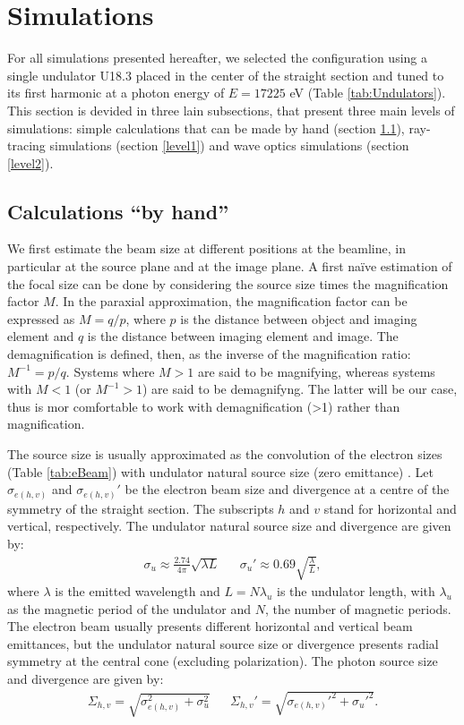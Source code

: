 \documentclass{iucr}              %
\begin{document}
\section{Simulations}

For all simulations presented hereafter, we selected the configuration using a single undulator U18.3 placed in the center of the straight section and tuned to its first harmonic at a photon energy of $E=17225$ eV (Table \ref{tab:Undulators}). This section is devided in three lain subsections, that present three main levels of simulations: simple calculations that can be made by hand (section \ref{level0}), ray-tracing simulations (section \ref{level1}) and wave optics simulations (section \ref{level2}).   

\subsection{Calculations ``by hand''}
\label{level0}

We first estimate the beam size at different positions at the beamline, in particular at the source plane and at the image plane. A first na{\"{i}}ve estimation of the focal size can be done by considering the source size times the magnification factor $M$. In the paraxial approximation, the magnification factor can be expressed as $M=q/p$, where $p$ is the distance between object and imaging element and $q$ is the distance between imaging element and image. The demagnification is defined, then, as the inverse of the magnification ratio: $M^{-1}=p/q$. Systems where $M>1$ are said to be magnifying, whereas systems with $M<1$ (or $M^{-1}>1$) are said to be demagnifyng. The latter will be our case, thus is mor comfortable to work with demagnification (>1) rather than magnification. 

The source size is usually approximated as the convolution of the electron sizes (Table \ref{tab:eBeam}) with undulator natural source size (zero emittance) \cite{elleaume}. Let $\sigma_{e(h,v)}$ and $\sigma_{e(h,v)}'$ be the electron beam size and divergence at a centre of the symmetry of the straight section. The subscripts $h$ and $v$ stand for horizontal and vertical, respectively. The undulator natural source size and divergence are given by:
\begin{align}
    \label{eq:photon small sigmas}
    \sigma_u\approx\frac{2.74}{4\pi}\sqrt{\lambda L} && \sigma_u'\approx0.69\sqrt{\frac{\lambda}{L}},
\end{align}
where $\lambda$ is the emitted wavelength and $L=N\lambda_u$ is the undulator length, with $\lambda_u$ as the magnetic period of the undulator and $N$, the number of magnetic periods. The electron beam usually presents different horizontal and vertical beam emittances, but the undulator natural source size or divergence presents radial symmetry at the central cone (excluding polarization). The photon source size and divergence are given by:
\begin{align}
\label{eq:photon big sigmas}
\Sigma_{h,v}=\sqrt{\sigma_{e(h,v)}^2 + \sigma_u^2} && \Sigma_{h,v}'=\sqrt{\sigma_{e(h,v)}'^2 + \sigma_u'^2}.
\end{align}
\end{document}
